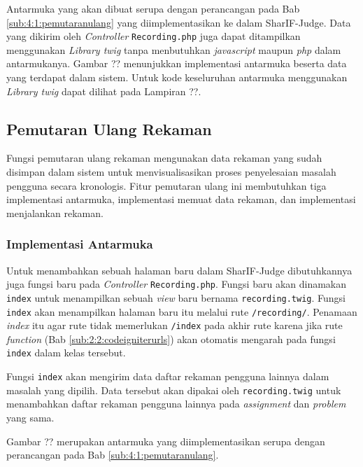Antarmuka yang akan dibuat serupa dengan perancangan pada Bab \ref{sub:4:1:pemutaranulang} yang diimplementasikan ke dalam SharIF-Judge. Data yang dikirim oleh \textit{Controller} \verb|Recording.php| juga dapat ditampilkan menggunakan \textit{Library twig} tanpa menbutuhkan \textit{javascript} maupun \textit{php} dalam antarmukanya. Gambar ?? menunjukkan implementasi antarmuka beserta data yang terdapat dalam sistem. Untuk kode keseluruhan antarmuka menggunakan \textit{Library twig} dapat dilihat pada Lampiran ??.

\subsection{Pemutaran Ulang Rekaman}

Fungsi pemutaran ulang rekaman mengunakan data rekaman yang sudah disimpan dalam sistem untuk menvisualisasikan proses penyelesaian masalah pengguna secara kronologis. Fitur pemutaran ulang ini membutuhkan tiga implementasi antarmuka, implementasi memuat data rekaman, dan implementasi menjalankan rekaman. 

\subsubsection{Implementasi Antarmuka}

Untuk menambahkan sebuah halaman baru dalam SharIF-Judge dibutuhkannya juga fungsi baru pada \textit{Controller} \verb|Recording.php|. Fungsi baru akan dinamakan \verb|index| untuk menampilkan sebuah \textit{view} baru bernama \verb|recording.twig|. Fungsi \verb|index| akan menampilkan halaman baru itu melalui rute \verb|/recording/|. Penamaan \textit{index} itu agar rute tidak memerlukan \verb|/index| pada akhir rute karena jika rute \textit{function} (Bab \ref{sub:2:2:codeigniterurls}) akan otomatis mengarah pada fungsi \verb|index| dalam kelas tersebut.

Fungsi \verb|index| akan mengirim data daftar rekaman pengguna lainnya dalam masalah yang dipilih. Data tersebut akan dipakai oleh \verb|recording.twig| untuk menambahkan daftar rekaman pengguna lainnya pada \textit{assignment} dan \textit{problem} yang sama.

Gambar ?? merupakan antarmuka yang diimplementasikan serupa dengan perancangan pada Bab \ref{sub:4:1:pemutaranulang}.



